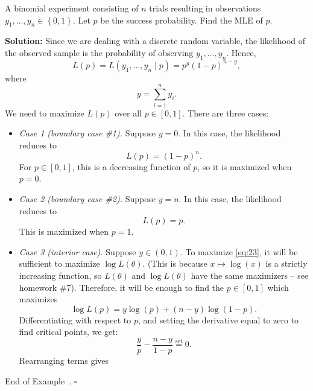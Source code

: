 \documentclass[10pt]{article}
\theoremstyle{definition}
\newtheorem{example}[theorem]{Example}
\renewenvironment{example}
{\begin{oldexample}}
  {\par\smallskip\hfill   End of Example~\theexample. $\square$    \par\end{oldexample}}
\newcommand{\vt}{\vskip 5mm} %
\newcommand{\Fl}{\vt\noindent\textbf} %
\newcommand{\1}[1]{\textbf{1}_{\left[#1\right]}} %
\begin{document}
\begin{example}[Example 9.14 in textbook]
  A binomial experiment consisting of $n$ trials resulting in observations
  $y_{1},\ldots,y_{n}\in \left\{0,1\right\}$. Let $p$ be the success
  probability. Find the MLE of $p$.

  \Fl{Solution:} Since we are dealing with a discrete random variable, the
  likelihood of the observed sample is the probability of observing
  $y_{1},\ldots,y_{n}$. Hence,
  \begin{equation}\label{eq:23}
    L(p) = L(y_{1},\ldots,y_{n}\mid p) = p^{y}(1-p)^{n-y},
  \end{equation}
  where
  \begin{equation*}
    y = \sum_{i=1}^{n} y_{i}.
  \end{equation*}
  We need to maximize $L(p)$ over all $p\in [0,1]$. There are three cases:
  \begin{itemize}
    \item \textit{Case 1 (boundary case \#1).} Suppose $y=0$. In this case, the
    likelihood reduces to
    \begin{equation*}
      L(p) = (1-p)^{n}.
    \end{equation*}
    For $p\in [0,1]$, this is a decreasing function of $p$, so it is maximized
    when $p=0$.
    \item \textit{Case 2 (boundary case \#2).} Suppose $y=n$. In this case, the
    likelihood reduces to
    \begin{equation*}
      L(p) = p.
    \end{equation*}
    This is maximized when $p=1$.
    \item \textit{Case 3 (interior case).} Suppose $y\in (0,1)$. To maximize
    \cref{eq:23}, it will be sufficient to maximize $\log L(\theta)$. (This is
    because $x\mapsto \log(x)$ is a strictly increasing function, so
    $L(\theta)$ and $\log L(\theta)$ have the same maximizers -- see homework
    \#7). Therefore, it will be enough to find the $p\in [0,1]$ which
    maximizes
    \begin{equation*}
      \log L(p) = y \log\left(p \right) + (n-y) \log\left(1-p \right).
    \end{equation*}
    Differentiating with respect to $p$, and setting the derivative equal to
    zero to find critical points, we get:
    \begin{equation*}
      \frac{y}{p} - \frac{n-y}{1-p} \overset{\text{set}}{=} 0.
    \end{equation*}
    Rearranging terms gives

\end{itemize}
\end{example}
\end{document}
